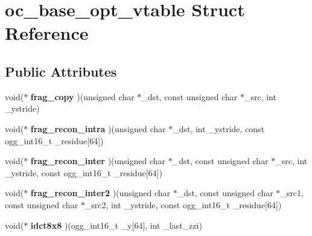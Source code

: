 \hypertarget{structoc__base__opt__vtable}{\section{oc\+\_\+base\+\_\+opt\+\_\+vtable Struct Reference}
\label{structoc__base__opt__vtable}
}
\subsection*{Public Attributes}
\begin{DoxyCompactItemize}
\item 
\hypertarget{structoc__base__opt__vtable_a436b0e2e0e7a5616d4bc14c04adf9c66}{void($\ast$ {\bfseries frag\+\_\+copy} )(unsigned char $\ast$\+\_\+dst, const unsigned char $\ast$\+\_\+src, int \+\_\+ystride)}\label{structoc__base__opt__vtable_a436b0e2e0e7a5616d4bc14c04adf9c66}

\item 
\hypertarget{structoc__base__opt__vtable_a7275a71e912028d2028af2639c4ce9f7}{void($\ast$ {\bfseries frag\+\_\+recon\+\_\+intra} )(unsigned char $\ast$\+\_\+dst, int \+\_\+ystride, const ogg\+\_\+int16\+\_\+t \+\_\+residue\mbox{[}64\mbox{]})}\label{structoc__base__opt__vtable_a7275a71e912028d2028af2639c4ce9f7}

\item 
\hypertarget{structoc__base__opt__vtable_a02bf9141ce9bc523da04fc4a33afbc05}{void($\ast$ {\bfseries frag\+\_\+recon\+\_\+inter} )(unsigned char $\ast$\+\_\+dst, const unsigned char $\ast$\+\_\+src, int \+\_\+ystride, const ogg\+\_\+int16\+\_\+t \+\_\+residue\mbox{[}64\mbox{]})}\label{structoc__base__opt__vtable_a02bf9141ce9bc523da04fc4a33afbc05}

\item 
\hypertarget{structoc__base__opt__vtable_a445c190b9be0d1eeec65dc439da02756}{void($\ast$ {\bfseries frag\+\_\+recon\+\_\+inter2} )(unsigned char $\ast$\+\_\+dst, const unsigned char $\ast$\+\_\+src1, const unsigned char $\ast$\+\_\+src2, int \+\_\+ystride, const ogg\+\_\+int16\+\_\+t \+\_\+residue\mbox{[}64\mbox{]})}\label{structoc__base__opt__vtable_a445c190b9be0d1eeec65dc439da02756}

\item 
\hypertarget{structoc__base__opt__vtable_a9e964cdacdf697257dc24a8889a14fb8}{void($\ast$ {\bfseries idct8x8} )(ogg\+\_\+int16\+\_\+t \+\_\+y\mbox{[}64\mbox{]}, int \+\_\+last\+\_\+zzi)}\label{structoc__base__opt__vtable_a9e964cdacdf697257dc24a8889a14fb8}


\end{DoxyCompactItemize}

